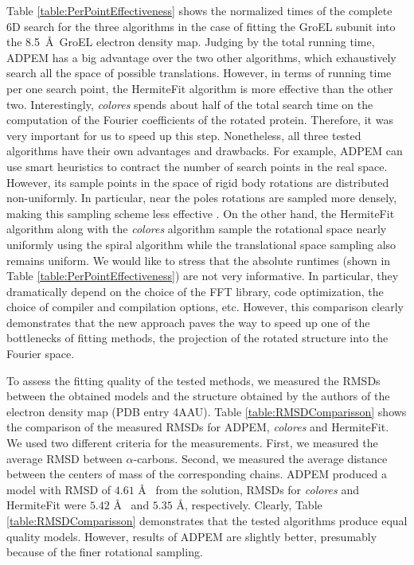 Table \ref{table:PerPointEffectiveness} shows the normalized times of the complete 6D search for the three algorithms in the case of fitting the GroEL subunit into 
the 8.5~\AA~GroEL electron density map. 
%
Judging by the total running time, ADP\underline{\hspace*{0.2cm}}EM has a big advantage over the two other algorithms, which exhaustively search all the space of possible translations. 
However,
in terms of running time per one search point, the HermiteFit algorithm is more effective than the other two.
%
Interestingly, {\em colores}  spends about half of the total search time on the computation of the Fourier coefficients of the rotated protein. Therefore, it was very important for us to speed up this step. 
Nonetheless, all three tested algorithms have their own advantages and drawbacks. For example, ADP\underline{\hspace*{0.2cm}}EM can use smart heuristics to contract the number of
search points in the real space. However, its sample points in the space of rigid body rotations are distributed non-uniformly.
In particular, near the poles rotations are sampled more densely, making this sampling scheme less effective \cite{saff1997distributing}. 
On the other hand, the HermiteFit algorithm along with the {\em colores} algorithm sample the rotational space nearly uniformly using the spiral algorithm
while the translational space sampling also remains uniform. 
%
We would like to stress that the absolute runtimes (shown in Table \ref{table:PerPointEffectiveness}) are not very informative. In particular, they dramatically depend on the choice of the FFT library, code optimization, the choice of compiler and compilation options, etc. However, this comparison clearly demonstrates that the new approach paves the way to speed up one of the bottlenecks of fitting methods, the projection of the rotated structure into the Fourier space.

%
To assess the fitting quality of the tested methods, we measured the RMSDs between the obtained models and the structure obtained by the authors of 
the electron density map (PDB entry 4AAU). 
Table \ref{table:RMSDComparisson} shows the comparison of the measured RMSDs for ADP\underline{\hspace*{0.2cm}}EM, {\em colores} and HermiteFit.
We used two different criteria for the measurements. 
First, we  measured the average RMSD between $\alpha$-carbons. Second, we measured the average distance between the centers of mass of the corresponding chains.
%
 ADP\underline{\hspace*{0.2cm}}EM produced a model with RMSD of $4.61$ \AA~ from the solution, RMSDs for {\em colores} and HermiteFit were $5.42$ \AA~ and $5.35$ \AA, respectively.
%
Clearly, Table \ref{table:RMSDComparisson} demonstrates that the tested algorithms produce equal quality models.
However, results of ADP\underline{\hspace*{0.2cm}}EM are slightly better, presumably because of the finer rotational sampling.

